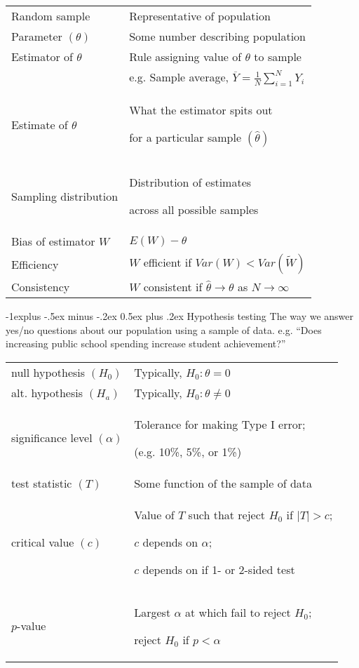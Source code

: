 \documentclass[10pt,landscape]{article}
\makeatletter
\renewcommand{\subsection}{\@startsection{subsection}{2}{0mm}%
                                {-1explus -.5ex minus -.2ex}%
                                {0.5ex plus .2ex}%
                                {\normalfont\normalsize\bfseries}}
\makeatother
\begin{document}
\begin{multicols}{3}
\medskip{}

\begin{tabular}{@{}p{\the\MyLen}%
                @{}p{\linewidth-\the\MyLen}@{}}
Random sample         &  Representative of population \\
Parameter $(\theta)$  &  Some number describing population  \\
Estimator of $\theta$ &  Rule assigning value of $\theta$ to sample    \\
                      &  e.g. Sample average, $\overline{Y} = \frac{1}{N}\sum_{i=1}^{N} Y_{i}$ \\
Estimate of $\theta$  &  What the estimator spits out \par
                         for a particular sample $(\hat{\theta})$   \\
Sampling distribution & Distribution of estimates \par
                        across all possible samples \\
Bias of estimator $W$ & $E\left(W\right)-\theta$ \\
Efficiency            & $W$ efficient if $Var(W)<Var(\widetilde{W})$ \\
Consistency           & $W$ consistent if $\hat{\theta}\rightarrow\theta$ as $N\rightarrow\infty$ \\
\end{tabular}

\subsection{Hypothesis testing}
The way we answer yes/no questions about our population using a sample of data. e.g. ``Does increasing public school spending increase student achievement?''

\medskip{}

\begin{tabular}{@{}p{\the\MyLen}%
                @{}p{\linewidth-\the\MyLen}@{}}
null hypothesis $(H_0)$       & Typically, $H_0: \theta=0$ \\
alt. hypothesis $(H_a)$       & Typically, $H_0: \theta\neq 0$ \\
significance level $(\alpha)$ & Tolerance for making Type I error; \par (e.g. 10\%, 5\%, or 1\%)\\
test statistic $(T)$          & Some function of the sample of data \\
critical value $(c)$          & Value of $T$ such that reject $H_0$ if $\vert T \vert > c$; \par $c$ depends on $\alpha$; \par $c$ depends on if 1- or 2-sided test\\
$p$-value                     & Largest $\alpha$ at which fail to reject $H_0$; \par reject $H_0$ if $p<\alpha$ \\
\end{tabular}


\end{multicols}
\end{document}
